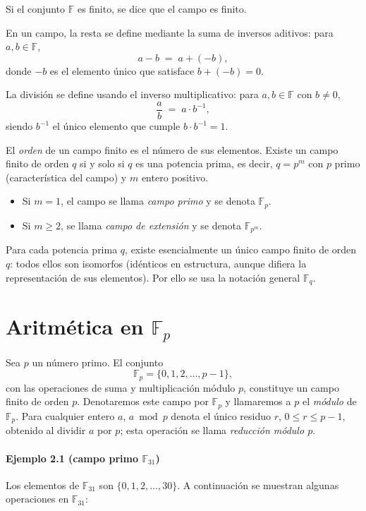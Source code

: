 Si el conjunto \(\mathbb{F}\) es finito, se dice que el campo es finito.  

En un campo, la resta se define mediante la suma de inversos aditivos: para \(a,b\in\mathbb{F}\),  
\[
  a - b \;=\; a + (-b),
\]
donde \(-b\) es el elemento único que satisface \(b + (-b) = 0\).  

La división se define usando el inverso multiplicativo: para \(a,b\in\mathbb{F}\) con \(b\neq0\),
\[
  \frac{a}{b} \;=\; a \cdot b^{-1},
\]
siendo \(b^{-1}\) el único elemento que cumple \(b\cdot b^{-1}=1\).  

El \emph{orden} de un campo finito es el número de sus elementos. Existe un campo finito de orden \(q\) si y solo si \(q\) es una potencia prima, es decir, \(q = p^m\) con \(p\) primo (característica del campo) y \(m\) entero positivo.  

\begin{itemize}
  \item Si \(m=1\), el campo se llama \emph{campo primo} y se denota \(\mathbb{F}_p\).  
  \item Si \(m\ge2\), se llama \emph{campo de extensión} y se denota \(\mathbb{F}_{p^m}\).  
\end{itemize}

Para cada potencia prima \(q\), existe esencialmente un único campo finito de orden \(q\): todos ellos son isomorfos (idénticos en estructura, aunque difiera la representación de sus elementos). Por ello se usa la notación general \(\mathbb{F}_q\).  



\section{Aritmética en \texorpdfstring{$\mathbb{F}_p$}{Fp}}
Sea $p$ un número primo. El conjunto
$$
  \mathbb{F}_p = \{0,1,2,\dots,p-1\},
$$
con las operaciones de suma y multiplicación módulo $p$, constituye un campo finito de orden $p$. Denotaremos este campo por $\mathbb{F}_p$ y llamaremos a $p$ el \emph{módulo} de $\mathbb{F}_p$. Para cualquier entero $a$, $a \bmod p$ denota el único residuo $r$, $0\le r\le p-1$, obtenido al dividir $a$ por $p$; esta operación se llama \emph{reducción módulo $p$}.

\paragraph{Ejemplo 2.1 (campo primo $\mathbb{F}_{31}$)}  
Los elementos de $\mathbb{F}_{31}$ son $\{0,1,2,\dots,30\}$. A continuación se muestran algunas operaciones en $\mathbb{F}_{31}$:

